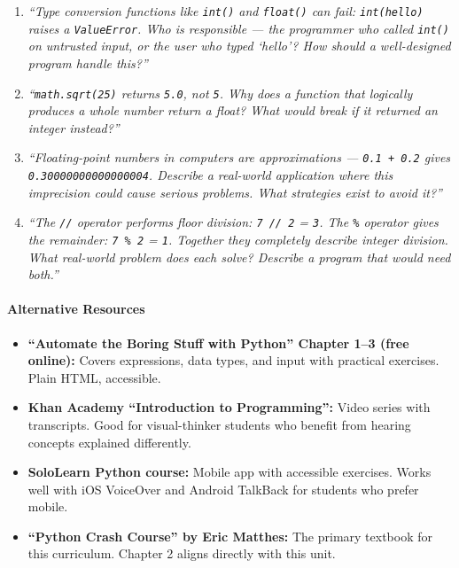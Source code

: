 \documentclass[
  justified,
  openright,
]{tufte-book}
\let\paragraph\paragraph
\let\paragraph\paragraph
\providecommand{\tightlist}{%
  \setlength{\itemsep}{0pt}\setlength{\parskip}{0pt}}
\begin{document}
\begin{enumerate}
\def\labelenumi{\arabic{enumi}.}
\item
  \emph{``Type conversion functions like \texttt{int()} and
  \texttt{float()} can fail:
  \texttt{int(\textquotesingle{}hello\textquotesingle{})} raises a
  \texttt{ValueError}. Who is responsible --- the programmer who called
  \texttt{int()} on untrusted input, or the user who typed `hello'? How
  should a well-designed program handle this?''}
\item
  \emph{``\texttt{math.sqrt(25)} returns \texttt{5.0}, not \texttt{5}.
  Why does a function that logically produces a whole number return a
  float? What would break if it returned an integer instead?''}
\item
  \emph{``Floating-point numbers in computers are approximations ---
  \texttt{0.1\ +\ 0.2} gives \texttt{0.30000000000000004}. Describe a
  real-world application where this imprecision could cause serious
  problems. What strategies exist to avoid it?''}
\item
  \emph{``The \texttt{//} operator performs floor division:
  \texttt{7\ //\ 2} = \texttt{3}. The \texttt{\%} operator gives the
  remainder: \texttt{7\ \%\ 2} = \texttt{1}. Together they completely
  describe integer division. What real-world problem does each solve?
  Describe a program that would need both.''}
\end{enumerate}

\paragraph{Alternative Resources}\label{alternative-resources-1}

\begin{itemize}
\tightlist
\item
  \textbf{``Automate the Boring Stuff with Python'' Chapter 1--3 (free
  online):} Covers expressions, data types, and input with practical
  exercises. Plain HTML, accessible.
\item
  \textbf{Khan Academy ``Introduction to Programming'':} Video series
  with transcripts. Good for visual-thinker students who benefit from
  hearing concepts explained differently.
\item
  \textbf{SoloLearn Python course:} Mobile app with accessible
  exercises. Works well with iOS VoiceOver and Android TalkBack for
  students who prefer mobile.
\item
  \textbf{``Python Crash Course'' by Eric Matthes:} The primary textbook
  for this curriculum. Chapter 2 aligns directly with this unit.
\end{itemize}
\end{document}
